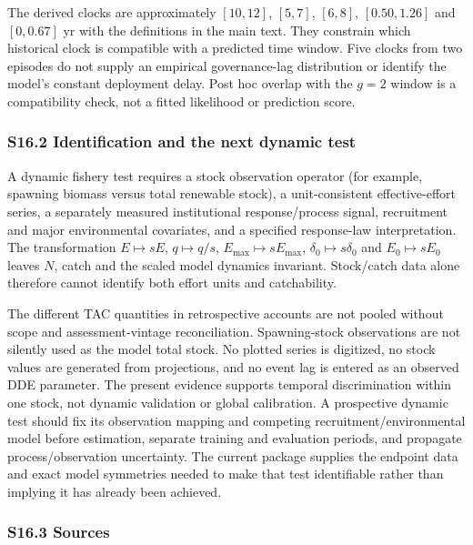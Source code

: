\documentclass[
  10pt,
  a4paper,
]{article}
\begin{document}
The derived clocks are approximately \([10,12]\), \([5,7]\), \([6,8]\),
\([0.50,1.26]\) and \([0,0.67]\) yr with the definitions in the main
text. They constrain which historical clock is compatible with a
predicted time window. Five clocks from two episodes do not supply an
empirical governance-lag distribution or identify the model's constant
deployment delay. Post hoc overlap with the \(g=2\) window is a
compatibility check, not a fitted likelihood or prediction score.

\subsubsection{S16.2 Identification and the next dynamic
test}\label{s16.2-identification-and-the-next-dynamic-test}

A dynamic fishery test requires a stock observation operator (for
example, spawning biomass versus total renewable stock), a
unit-consistent effective-effort series, a separately measured
institutional response/process signal, recruitment and major
environmental covariates, and a specified response-law interpretation.
The transformation \(E\mapsto sE\), \(q\mapsto q/s\),
\(E_{\max}\mapsto sE_{\max}\), \(\delta_0\mapsto s\delta_0\) and
\(E_0\mapsto sE_0\) leaves \(N\), catch and the scaled model dynamics
invariant. Stock/catch data alone therefore cannot identify both effort
units and catchability.

The different TAC quantities in retrospective accounts are not pooled
without scope and assessment-vintage reconciliation. Spawning-stock
observations are not silently used as the model total stock. No plotted
series is digitized, no stock values are generated from projections, and
no event lag is entered as an observed DDE parameter. The present
evidence supports temporal discrimination within one stock, not dynamic
validation or global calibration. A prospective dynamic test should fix
its observation mapping and competing recruitment/environmental model
before estimation, separate training and evaluation periods, and
propagate process/observation uncertainty. The current package supplies
the endpoint data and exact model symmetries needed to make that test
identifiable rather than implying it has already been achieved.

\subsubsection{S16.3 Sources}\label{s16.3-sources}
\end{document}
